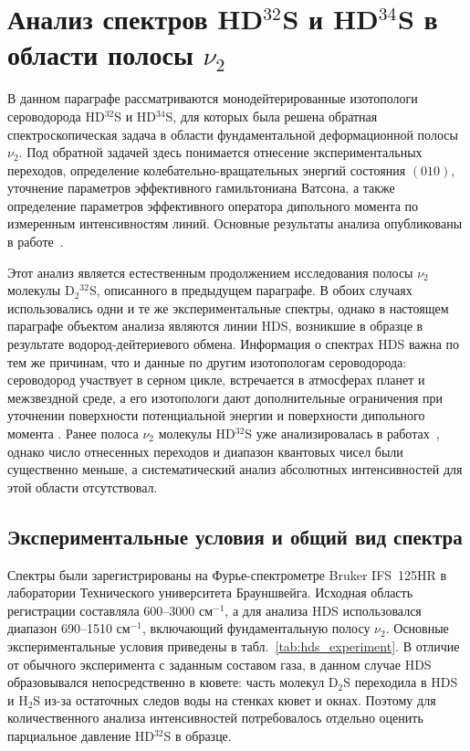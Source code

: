 \section{Анализ спектров HD$^{32}$S и HD$^{34}$S в области полосы $\nu_2$}\label{sec:ch2/HDS}

В данном параграфе рассматриваются монодейтерированные изотопологи сероводорода HD$^{32}$S и
HD$^{34}$S, для которых была решена обратная спектроскопическая задача в области фундаментальной
деформационной полосы $\nu_2$. Под обратной задачей здесь понимается отнесение экспериментальных
переходов, определение колебательно-вращательных энергий состояния $(010)$, уточнение параметров
эффективного гамильтониана Ватсона, а также определение параметров эффективного оператора дипольного
момента по измеренным интенсивностям линий. Основные результаты анализа опубликованы в
работе~\cite{hds_sydow2019}.

Этот анализ является естественным продолжением исследования полосы $\nu_2$ молекулы D$_2{}^{32}$S,
описанного в предыдущем параграфе. В обоих случаях использовались одни и те же экспериментальные
спектры, однако в настоящем параграфе объектом анализа являются линии HDS, возникшие в образце в
результате водород-дейтериевого обмена. Информация о спектрах HDS важна по тем же причинам, что и
данные по другим изотопологам сероводорода: сероводород участвует в серном цикле, встречается в
атмосферах планет и межзвездной среде, а его изотопологи дают дополнительные ограничения при уточнении
поверхности потенциальной энергии и поверхности дипольного момента
\cite{h2s_farquhar2000_science,h2s_farquhar2000_nature,h2s_thaddeus1972,h2s_vastel2003}. Ранее полоса
$\nu_2$ молекулы HD$^{32}$S уже анализировалась в работах~\cite{hds_camy1989,hds_ulenikov1995}, однако
число отнесенных переходов и диапазон квантовых чисел были существенно меньше, а систематический
анализ абсолютных интенсивностей для этой области отсутствовал.

\subsection{Экспериментальные условия и общий вид спектра}

Спектры были зарегистрированы на Фурье-спектрометре Bruker IFS~125HR в лаборатории Технического
университета Брауншвейга. Исходная область регистрации составляла 600--3000 см$^{-1}$, а для анализа
HDS использовался диапазон 690--1510 см$^{-1}$, включающий фундаментальную полосу $\nu_2$. Основные
экспериментальные условия приведены в табл.~\ref{tab:hds_experiment}. В отличие от обычного
эксперимента с заданным составом газа, в данном случае HDS образовывался непосредственно в кювете:
часть молекул D$_2$S переходила в HDS и H$_2$S из-за остаточных следов воды на стенках кювет и окнах.
Поэтому для количественного анализа интенсивностей потребовалось отдельно оценить парциальное давление
HD$^{32}$S в образце.

